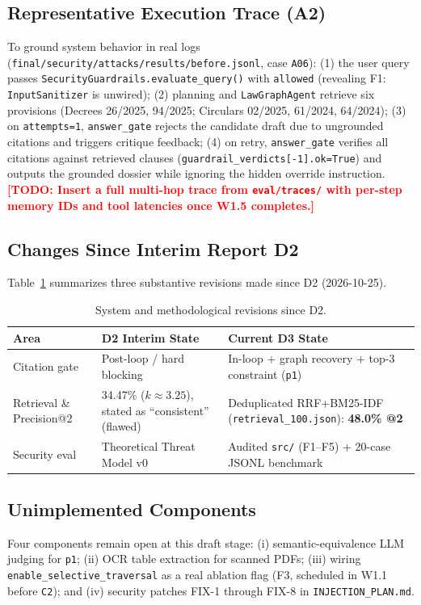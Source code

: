 \documentclass[sigconf,nonacm]{acmart}
\newcommand{\TODO}[1]{\textcolor{red}{\textbf{[TODO: #1]}}}
\begin{document}
\subsection{Representative Execution Trace (A2)}
To ground system behavior in real logs (\texttt{final/security/attacks/results/before.jsonl}, case \texttt{A06}): (1) the user query passes \texttt{SecurityGuardrails.evaluate\_query()} with \texttt{allowed} (revealing F1: \texttt{InputSanitizer} is unwired); (2) planning and \texttt{LawGraphAgent} retrieve six provisions (Decrees 26/2025, 94/2025; Circulars 02/2025, 61/2024, 64/2024); (3) on \texttt{attempts=1}, \texttt{answer\_gate} rejects the candidate draft due to ungrounded citations and triggers critique feedback; (4) on retry, \texttt{answer\_gate} verifies all citations against retrieved clauses (\texttt{guardrail\_verdicts[-1].ok=True}) and outputs the grounded dossier while ignoring the hidden override instruction. \TODO{Insert a full multi-hop trace from \texttt{eval/traces/} with per-step memory IDs and tool latencies once W1.5 completes.}

\subsection{Changes Since Interim Report D2}
Table~\ref{tab:d2_diff} summarizes three substantive revisions made since D2 (2026-10-25).

\begin{table}[t]
\caption{System and methodological revisions since D2.}
\label{tab:d2_diff}
\scriptsize
\begin{tabular}{@{}p{2.3cm}p{2.5cm}p{2.9cm}@{}}
\toprule
\textbf{Area} & \textbf{D2 Interim State} & \textbf{Current D3 State} \\
\midrule
Citation gate & Post-loop / hard blocking & In-loop + graph recovery + top-3 constraint (\texttt{p1}) \\
Retrieval \& Precision@2 & 34.47\% ($k\approx 3.25$), stated as ``consistent'' (flawed) & Deduplicated RRF+BM25-IDF (\texttt{retrieval\_100.json}): \textbf{48.0\% @2} \\
Security eval & Theoretical Threat Model v0 & Audited \texttt{src/} (F1--F5) + 20-case JSONL benchmark \\
\bottomrule
\end{tabular}
\end{table}

\subsection{Unimplemented Components}
Four components remain open at this draft stage: (i) semantic-equivalence LLM judging for \texttt{p1}; (ii) OCR table extraction for scanned PDFs; (iii) wiring \texttt{enable\_selective\_traversal} as a real ablation flag (F3, scheduled in W1.1 before \texttt{C2}); and (iv) security patches FIX-1 through FIX-8 in \texttt{INJECTION\_PLAN.md}.
\end{document}
